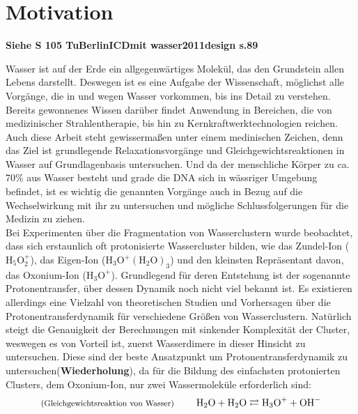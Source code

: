 
  \chapter{Motivation} \label{sec:Motivation}
  
  \textbf{Siehe S 105 TuBerlinICDmit wasser2011design s.89}
  
  Wasser ist auf der Erde ein allgegenwärtiges Molekül, das den Grundstein allen Lebens darstellt. Deswegen ist es eine Aufgabe der Wissenschaft, möglichst alle Vorgänge, die in und wegen Wasser vorkommen, bis ins Detail zu verstehen. Bereits gewonnenes Wissen darüber findet Anwendung in Bereichen, die von medizinischer Strahlentherapie, bis hin zu Kernkraftwerktechnologien reichen. 
  Auch diese Arbeit steht gewissermaßen unter einem medinischen Zeichen, denn das Ziel ist grundlegende Relaxationsvorgänge und Gleichgewichtsreaktionen in Wasser auf Grundlagenbasis untersuchen. Und da der menschliche Körper zu ca. 70\% aus Wasser besteht und grade die DNA sich in wässriger Umgebung befindet, ist es wichtig die genannten Vorgänge auch in Bezug auf die Wechselwirkung mit ihr zu untersuchen und mögliche Schlussfolgerungen für die Medizin zu ziehen.\\
  Bei Experimenten über die Fragmentation von Wasserclustern wurde beobachtet, dass sich erstaunlich oft protonisierte Wassercluster bilden, wie das Zundel-Ion ($\mathrm{H_5O_2^+}$), das Eigen-Ion ($\mathrm{H_3O^+(H_2O)_3}$) und den kleinsten Repräsentant davon, das Oxonium-Ion ($\mathrm{H_3O^+}$). Grundlegend für deren Entstehung ist der sogenannte Protonentransfer, über dessen Dynamik noch nicht viel bekannt ist. Es existieren allerdings eine Vielzahl von theoretischen Studien und Vorhersagen über die Protonentransferdynamik für verschiedene Größen von Wasserclustern. Natürlich steigt die Genauigkeit der Berechnungen mit sinkender Komplexität der Cluster, weswegen es von Vorteil ist, zuerst Wasserdimere in dieser Hinsicht zu untersuchen. Diese sind der beste Ansatzpunkt um Protonentransferdynamik zu untersuchen(\textbf{Wiederholung}), da für die Bildung des einfachsten protonierten Clusters, dem Oxonium-Ion, nur zwei Wassermoleküle erforderlich sind:
  \begin{equation}
  \textmd{{\footnotesize(Gleichgewichtsreaktion von Wasser) }}\qquad \textmd{H}_2\textmd{O} + \textmd{H}_2\textmd{O} \rightleftarrows \textmd{H}_3\textmd{O}^+ + \textmd{O}\textmd{H}^- 
  \end{equation} 
  
